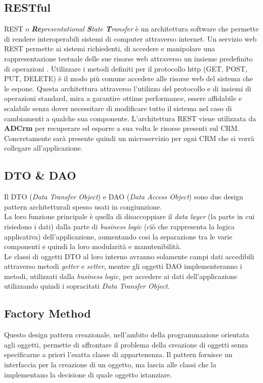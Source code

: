 \documentclass[12pt,a4paper,twoside,openright,english]{book}
\begin{document}
\subsection{RESTful}
REST o \textit{\textbf{Re}presentational \textbf{S}tate \textbf{T}ransfer} è un architettura software che permette di rendere interoperabili sistemi di computer attraverso internet. 
Un servizio web REST permette ai sistemi richiedenti, di accedere e manipolare una rappresentazione testuale delle sue risorse web attraverso un insieme predefinito di operazioni .
Utilizzare i metodi definiti per il protocollo http (GET, POST, PUT, DELETE) è il modo più comune accedere alle risorse web del sistema che le espone.
Questa architettura attraverso l'utilizzo del protocollo  e di insiemi di operazioni standard, mira a garantire ottime performance, essere affidabile e scalabile senza dover necessitare di modificare tutto il sistema nel caso di cambiamenti a qualche sua componente.
L'architettura REST viene utilizzata da \textbf{ADCrm\textbf{}} per recuperare ed esporre a sua volta le risorse presenti sul CRM.
Concretamente sarà presente quindi un microservizio per ogni CRM che si vorrà collegare all'applicazione.

\subsection{DTO \& DAO}
Il DTO (\textit{Data Transfer Object}) e DAO (\textit{Data Access Object}) sono due design pattern architetturali spesso usati in congiunzione.\\
La loro funzione principale è quella di disaccoppiare il \textit{data layer} (la parte in cui risiedono i dati) dalla parte di \textit{business logic} (ciò che rappresenta la logica applicativa) dell'applicazione, aumentando cosi la separazione tra le varie componenti e quindi la loro modularità e manutenibilità.\\
Le classi di oggetti DTO al loro interno avranno solamente campi dati accedibili attraverso metodi \textit{getter} e \textit{setter}, mentre gli oggetti DAO implementeranno i metodi, utilizzati dalla \textit{business logic}, per accedere ai dati dell'applicazione utilizzando quindi i sopracitati \textit{Data Transfer Object}.

\subsection{Factory Method} \label{factory}
Questo design pattern creazionale, nell'ambito della programmazione orientata agli oggetti, permette di affrontare il problema della creazione di oggetti senza specificarne a priori l'esatta classe di appartenenza.
Il pattern fornisce un interfaccia per la creazione di un oggetto, ma lascia alle classi che la implementano la decisione di quale oggetto istanziare.\\
\end{document}
